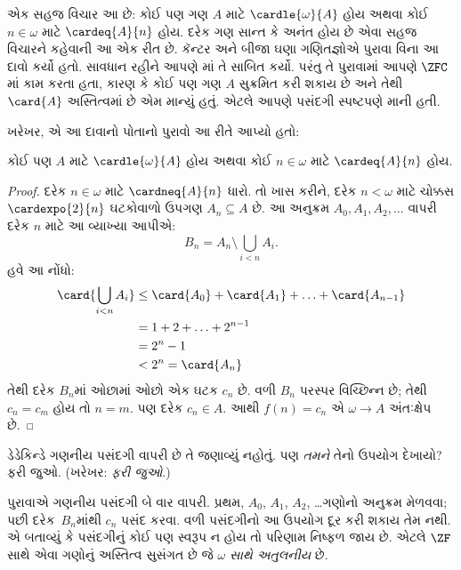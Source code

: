 \begin{ex}
એક સહજ વિચાર આ છે: કોઈ પણ ગણ $A$
માટે $\cardle{\omega}{A}$ હોય અથવા
કોઈ $n \in \omega$ માટે
$\cardeq{A}{n}$ હોય. દરેક ગણ સાન્ત કે
અનંત હોય છે એવા સહજ વિચારને કહેવાની
આ એક રીત છે. કૅન્ટર અને બીજા ઘણા
ગણિતજ્ઞોએ પુરાવા વિના આ દાવો કર્યો હતો.
સાવધાન રહીને આપણે
માં
તે સાબિત કર્યો. પરંતુ તે પુરાવામાં આપણે
$\ZFC$માં કામ કરતા હતા, કારણ કે કોઈ
પણ ગણ $A$ સુક્રમિત કરી શકાય છે અને
તેથી $\card{A}$ અસ્તિત્વમાં છે એમ માન્યું
હતું. એટલે આપણે પસંદગી સ્પષ્ટપણે માની હતી.

ખરેખર, \citet{Dedekind1888}એ આ દાવાનો
પોતાનો પુરાવો આ રીતે આપ્યો હતો:

\begin{thm}
કોઈ પણ $A$ માટે $\cardle{\omega}{A}$ હોય
અથવા કોઈ $n \in \omega$ માટે
$\cardeq{A}{n}$ હોય.
\end{thm}

\begin{proof}
દરેક $n \in \omega$ માટે
$\cardneq{A}{n}$ ધારો. તો ખાસ કરીને,
દરેક $n < \omega$ માટે ચોક્કસ
$\cardexpo{2}{n}$ ઘટકોવાળો ઉપગણ
$A_n \subseteq A$ છે. આ અનુક્રમ
$A_0, A_1, A_2, \ldots$ વાપરી દરેક
$n$ માટે આ વ્યાખ્યા આપીએ:
\[
	B_n = A_n \setminus \bigcup_{i < n} A_i.
\]
હવે આ નોંધો:
\begin{align*}
	\card{\bigcup_{i < n}A_i} 
	&\leq \card{A_0} + \card{A_1} + \ldots + \card{A_{n-1}}\\
	&=1 + 2 + \ldots + 2^{n-1}\\
	& = 2^n - 1\\
	& < 2^n = \card{A_n}
\end{align*}
તેથી દરેક $B_n$માં ઓછામાં ઓછો એક
ઘટક $c_n$ છે. વળી $B_n$ પરસ્પર
વિચ્છિન્ન છે; તેથી $c_n = c_m$ હોય
તો $n = m$. પણ દરેક $c_n \in A$.
આથી $f(n) = c_n$ એ
$\omega \to A$ અંતઃક્ષેપ છે.
\end{proof}
\noindent
ડેડેકિન્ડે ગણનીય પસંદગી વાપરી છે તે
જણાવ્યું નહોતું. પણ \emph{તમને} તેનો
ઉપયોગ દેખાયો? ફરી જુઓ. (ખરેખર:
\emph{ફરી જુઓ}.)

પુરાવાએ ગણનીય પસંદગી બે વાર વાપરી.
પ્રથમ, $A_0$, $A_1$, $A_2$, \dots\@ ગણોનો
અનુક્રમ મેળવવા; પછી દરેક~$B_n$માંથી
$c_n$ પસંદ કરવા. વળી પસંદગીનો આ
ઉપયોગ દૂર કરી શકાય તેમ નથી.
\citet[p.~138]{Cohen1966}એ બતાવ્યું કે
પસંદગીનું કોઈ પણ સ્વરૂપ ન હોય તો પરિણામ
નિષ્ફળ જાય છે. એટલે $\ZF$ સાથે એવા
ગણોનું અસ્તિત્વ સુસંગત છે જે
\emph{$\omega$ સાથે અતુલનીય} છે.
\end{ex}

